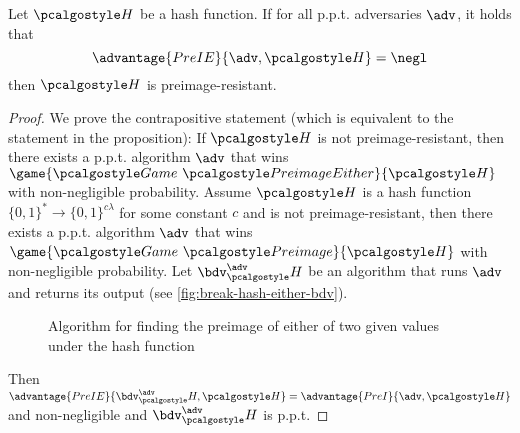 \begin{proposition}
  Let $\algo{H}$ be a hash function. If for all p.p.t. adversaries $\adv$, it holds that
  \[
  \advantage{PreIE}{\adv, \algo{H}} = \negl
  \]
  then $\algo{H}$ is preimage-resistant.
\end{proposition}
\begin{proof}
  We prove the contrapositive statement (which is equivalent to the statement in the proposition):
  If $\algo{H}$ is not preimage-resistant, then there exists a p.p.t. algorithm $\adv$ that wins $\game{\Game~\algo{PreimageEither}}{\algo{H}}$ with non-negligible probability.
  Assume $\algo{H}$ is a hash function $\{0,1\}^* \rightarrow \{0,1\}^{c\lambda}$ for some constant $c$ and is not preimage-resistant, then there exists a p.p.t. algorithm $\adv$ that wins $\game{\Game~\algo{Preimage}}{\algo{H}}$ with non-negligible probability.
  Let $\bdv^\adv_\algo{H}$ be an algorithm that runs $\adv$ and returns its output (see \autoref{fig:break-hash-either-bdv}).
  \begin{figure}[tbhp]
  \begin{center}
    \begin{tcolorbox}[width=5cm]
      \begin{pchstack}[center]
      \end{pchstack}
    \end{tcolorbox}
  \end{center}
  \caption{Algorithm for finding the preimage of either of two given values under the hash function \label{fig:break-hash-either-bdv}}
  \end{figure}

  Then $\advantage{PreIE}{\bdv^\adv_\algo{H}, \algo{H}} = \advantage{PreI}{\adv, \algo{H}}$ and non-negligible and $\bdv^\adv_\algo{H}$ is p.p.t.
\end{proof}


